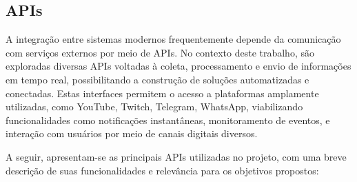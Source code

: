 

\subsection{APIs}


A integração entre sistemas modernos frequentemente depende da comunicação com serviços externos por meio de APIs. No contexto deste trabalho, são exploradas diversas APIs voltadas à coleta, processamento e envio de informações em tempo real, possibilitando a construção de soluções automatizadas e conectadas. Estas interfaces permitem o acesso a plataformas amplamente utilizadas, como YouTube, Twitch, Telegram, WhatsApp, viabilizando funcionalidades como notificações instantâneas, monitoramento de eventos, e interação com usuários por meio de canais digitais diversos.

A seguir, apresentam-se as principais APIs utilizadas no projeto, com uma breve descrição de suas funcionalidades e relevância para os objetivos propostos:
\par\vspace{0.5\baselineskip}

